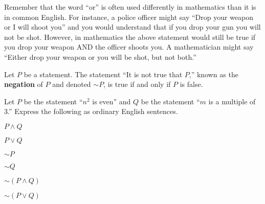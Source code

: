 Remember that the word ``or'' is often used differently in mathematics than it is in common English.  For instance, a police officer might say ``Drop your weapon or I will shoot you'' and you would understand that if you drop your gun you will not be shot.  However, in mathematics the above statement would still be true if you drop your weapon AND the officer shoots you.  A mathematician might say ``Either drop your weapon or you will be shot, but not both.''

\begin{definition}  Let $P$ be a statement.  The statement ``It is not true that $P$,'' known as the \textbf{negation} of $P$ and denoted $\sim\!P$, is true if and only if $P$ is false.  
\end{definition}

\begin{question}[resume]
 \item Let $P$ be the statement ``$n^2$ is even'' and $Q$ be the statement ``$m$ is a multiple of 3.''  Express the following as ordinary English sentences.
	\begin{qpart}
	\item $P \wedge Q$
	
	\vspace{.75in}
	
	\item $P \vee Q$
	
	\vspace{.75in}
	
	\item $\sim\!P$
	
	\vspace{.75in}
	
	\item $\sim\!Q$
	
	\vspace{.75in}
	
	\item $ \sim\!(P \wedge Q)$
	
	\vspace{.75in}
	
	\item $ \sim\!(P \vee Q)$
	
	\vspace{.75in}
	
	\end{qpart}
\end{question}

